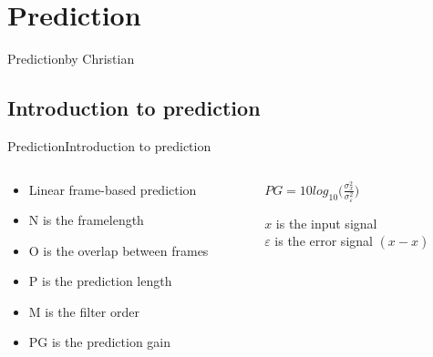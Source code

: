 \section{Prediction}
\begin{frame}{Prediction}{by Christian}
\end{frame}

\subsection{Introduction to prediction}
\begin{frame}{Prediction}{Introduction to prediction}
	\begin{columns}
		\begin{column}{0.5\textwidth}
			\begin{itemize}
				\item Linear frame-based prediction
				\item N is the framelength
				\item O is the overlap between frames
				\item P is the prediction length
				\item M is the filter order
				\item PG is the prediction gain
			\end{itemize}
		\end{column}
		\begin{column}{0.5\textwidth} 
			$PG = 10 log_{10}\bigg(\frac{\sigma^2_x}{\sigma^2_\varepsilon}\bigg)	$
			
			$x$ is the input signal\\
			$\varepsilon$ is the error signal $(x-\hat{x})$
		\end{column}
	\end{columns}
\end{frame}


